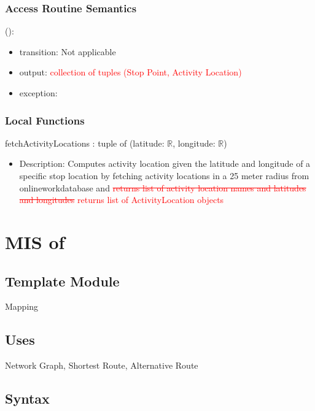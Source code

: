\documentclass[12pt, titlepage]{article}
\begin{document}
\subsubsection{Access Routine Semantics}

\noindent {}():
\begin{itemize}
\item transition: Not applicable
\item output: \textcolor{red}{collection of tuples (Stop Point, Activity Location)}
\item exception:  
\end{itemize}

\subsubsection{Local Functions}
fetchActivityLocations : tuple of (latitude: $\mathbb{R}$, longitude: $\mathbb{R}$)
\begin{itemize}
    \item Description: Computes activity location given the latitude and longitude of a specific stop location by fetching activity locations in a 25 meter radius from onlineworkdatabase and \textcolor{red}{\sout{returns list of activity location names and latitudes and longitudes} returns list of ActivityLocation objects} 
\end{itemize}
  
\newpage

\section{MIS of } \label{ModuleMapping} 

\subsection{Template Module}
Mapping

\subsection{Uses}%
Network Graph, Shortest Route, Alternative Route

\subsection{Syntax}
\end{document}
